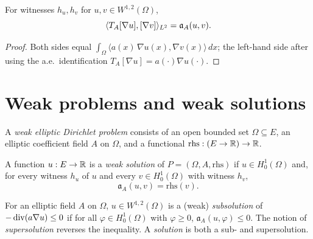 \begin{lemma}
\label{lem:coeffMulLpL_inner_gradLpOfWitness_eq_bilinFormOfCoeff}
\leanok
{}
For witnesses $h_u, h_v$ for $u, v \in W^{1,2}(\Omega)$,
\begin{equation*}
  \langle T_A [\nabla u], [\nabla v]\rangle_{L^{2}} = \mathfrak{a}_A(u, v).
\end{equation*}
\end{lemma}

\begin{proof}
\leanok
{}

Both sides equal $\int_\Omega \langle a(x)\,\nabla u(x), \nabla v(x)\rangle\,dx$; the left-hand side after using the a.e.\ identification $T_A[\nabla u] = a(\cdot)\nabla u(\cdot)$.
\end{proof}

\section{Weak problems and weak solutions}

\begin{definition}
\label{def:WeakProblem}
\leanok
{}
A \emph{weak elliptic Dirichlet problem} consists of an open bounded set $\Omega \subseteq E$, an elliptic coefficient field $A$ on $\Omega$, and a functional $\mathrm{rhs} : (E \to \mathbb{R}) \to \mathbb{R}$.
\end{definition}

\begin{definition}
\label{def:IsWeakSolution}
\leanok
{}
A function $u : E \to \mathbb{R}$ is a \emph{weak solution} of $P = (\Omega, A, \mathrm{rhs})$ if $u \in H^{1}_{0}(\Omega)$ and, for every witness $h_u$ of $u$ and every $v \in H^{1}_{0}(\Omega)$ with witness $h_v$,
\begin{equation*}
  \mathfrak{a}_A(u, v) = \mathrm{rhs}(v).
\end{equation*}
\end{definition}

\begin{definition}
\label{def:IsSubsolution}
\leanok
{}
For an elliptic field $A$ on $\Omega$, $u \in W^{1,2}(\Omega)$ is a (weak) \emph{subsolution} of $-\operatorname{div}(a\nabla u) \leq 0$ if for all $\varphi \in H^{1}_{0}(\Omega)$ with $\varphi \geq 0$, $\mathfrak{a}_A(u, \varphi) \leq 0$. The notion of \emph{supersolution} reverses the inequality. A \emph{solution} is both a sub- and supersolution.
\end{definition}

